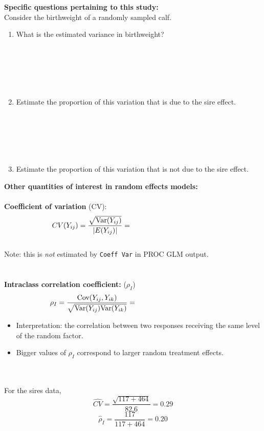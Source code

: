\textbf{Specific questions pertaining to this study:}\\
Consider the birthweight of a randomly sampled calf.
\begin{enumerate}
\item What is the estimated variance in birthweight?\\~\\~\\~\\~\\~\\
\item Estimate the proportion of this variation that is due to the sire effect.\\~\\~\\~\\~\\~\\
\item Estimate the proportion of this variation that is not due to the sire effect.
\end{enumerate}

\newpage

\textbf{Other quantities of interest in random effects models:}\\~\\
\textbf{Coefficient of variation} (CV): 
$$ CV(Y_{ij}) = \frac{\sqrt{\mbox{Var}(Y_{ij})}}{|E(Y_{ij})|} =~~~~~~~~~~~~~~~~~~~~~~~~~~~~~~~~~~~$$~\\
Note: this is {\em not} estimated by {\tt Coeff Var} in PROC GLM output.\\~\\~\\

\textbf{Intraclass correlation coefficient:} ($\rho_I$)
$$ \rho_I = \frac{\mbox{Cov}(Y_{ij},Y_{ik})}{\sqrt{\mbox{Var}(Y_{ij})\mbox{Var}(Y_{ik})}}= ~~~~~~~~~~~~~~~~~~~~~~~~~~~~~~~~~~$$

\begin{itemize}
\item Interpretation: the correlation between two responses receiving the same level of the random factor.
\item Bigger values of $\rho_I$ correspond to larger random treatment effects.
\end{itemize}
~\\~\\
For the sires data,
$$\widehat{CV}  =  \frac{\sqrt{117 + 464}}{82.6} = 0.29 $$
$$\hat\rho_I = \frac{117}{117+464} = 0.20$$ 

